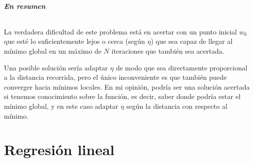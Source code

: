 \documentclass{article}
\begin{document}
    \paragraph*{\textbf{En resumen}}La verdadera dificultad de este problema está en acertar con un punto inicial $w_0$ que esté
    lo suficientemente lejos o cerca (según $\eta$) que sea capaz de llegar al mínimo global en un máximo de $N$
    iteraciones que también sea acertada. \par
    Una posible solución sería adaptar $\eta$ de modo que sea directamente
    proporcional a la distancia recorrida, pero el único inconveniente es que también puede converger hacia
    mínimos locales. En mi opinión, podría ser una solución acertada si tenemos conocimiento sobre la función, es decir,
    saber donde podría estar el mínimo global, y en este caso adaptar $\eta$ según la distancia con respecto al mínimo.


    \pagebreak

    \part{Regresión lineal}
\end{document}
